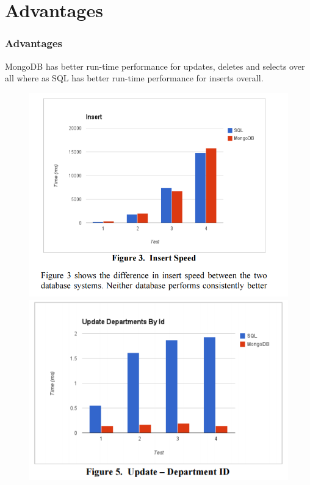 \documentclass{beamer}
\begin{document}
	\section{Advantages}
		\begin{frame}
		\frametitle{Advantages}
            \begin{itemize}
                MongoDB has better run-time performance for updates, deletes and selects over all where as SQL has better run-time performance for inserts overall.\hfill \break
                \blindtext
                    \begin{figure}[!htb]
                            \includegraphics[width=\linewidth]{insert}
                        \endminipage\hfill
                            \includegraphics[width=\linewidth]{update}

\end{figure}
\end{itemize}
\end{frame}
\end{document}
